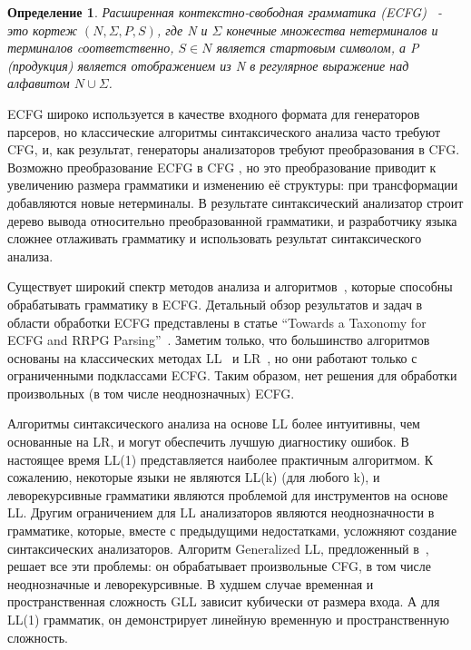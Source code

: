 \documentclass[14pt]{matmex-diploma-custom}
\newtheorem{mydef}{Определение}
\begin{document}
	\begin{mydef}
		Расширенная контекстно-свободная грамматика (ECFG)~\cite{ECFG} - это кортеж $(N, \Sigma, P, S)$,
		где N и $\Sigma$ конечные множества нетерминалов и терминалов cоответственно, 
		$S\in N$ является стартовым символом, а P (продукция) является отображением из N в
		регулярное выражение над алфавитом $N \cup \Sigma$.
		
	\end{mydef}
	ECFG широко используется в качестве входного формата для генераторов парсеров, 
	но классические алгоритмы синтаксического анализа часто требуют CFG, и, 
	как результат, генераторы анализаторов требуют преобразования в CFG. 
	Возможно преобразование ECFG в CFG \cite{ELL}, но это преобразование приводит к увеличению
	размера грамматики и изменению её структуры: при трансформации добавляются новые
	нетерминалы. В результате синтаксический анализатор строит дерево вывода относительно
	преобразованной грамматики, и разработчику языка сложнее отлаживать грамматику 
	и использовать результат синтаксического анализа.
	
	Существует широкий спектр методов анализа и алгоритмов~\cite{AttributedELL,ELRR,
		ECFGparsing,ELLParser,ELL,ECFG,ELALR,ELRParsing}, которые способны обрабатывать 
	грамматику в ECFG. Детальный обзор результатов и задач в области обработки ECFG 
	представлены в статье ``Towards a Taxonomy for ECFG and RRPG Parsing''~\cite{ECFG}.
	Заметим только, что большинство алгоритмов основаны на классических методах
	LL~\cite{ELLParser,AttributedELL,PredictiveECFG} и LR~\cite{ELRParsing,ELALR,ELRR},
	но они работают только с ограниченными подклассами ECFG. Таким образом, нет решения 
	для обработки произвольных (в том числе неоднозначных) ECFG.
	
	Алгоритмы синтаксического анализа на основе LL более интуитивны, чем основанные на LR, и могут
	обеспечить лучшую диагностику ошибок. В настоящее время LL(1) представляется
	наиболее практичным алгоритмом. К сожалению, некоторые языки не являются LL(k) (для любого k),
	и леворекурсивные грамматики являются проблемой для инструментов на основе LL. 
	Другим ограничением для LL анализаторов являются неоднозначности в грамматике, 
	которые, вместе с предыдущими недостатками, усложняют создание синтаксических 
	анализаторов. Алгоритм Generalized LL, предложенный в~\cite{scott2010gll}, решает 
	все эти проблемы: он обрабатывает произвольные CFG, в том числе неоднозначные и
	леворекурсивные.
	В худшем случае временная и пространственная сложность GLL зависит кубически от 
	размера входа. А для LL(1) грамматик, он демонстрирует линейную временную и
	пространственную сложность.
	
\end{document}
